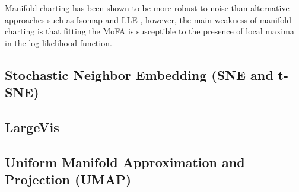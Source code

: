 Manifold charting has been shown to be more robust to noise than alternative approaches such as Isomap and LLE \cite{Brand2003ManifoldCharting}, however, the main weakness of manifold charting is that fitting the MoFA is susceptible to the presence of local maxima in the log-likelihood function.


\subsection{Stochastic Neighbor Embedding (SNE and t-SNE)} \label{sec:tSNE}


\subsection{LargeVis} \label{sec:largeVis}

\subsection{Uniform Manifold Approximation and Projection (UMAP)} \label{sec:UMAP}



